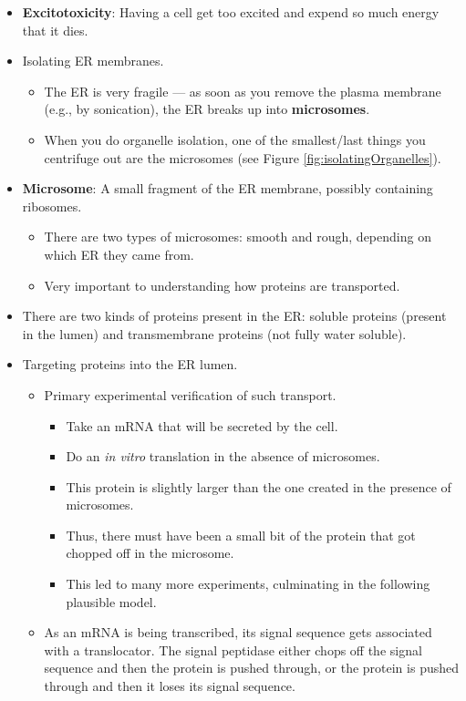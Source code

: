 \documentclass[../notes.tex]{subfiles}
\begin{document}
\begin{itemize}
    \item \textbf{Excitotoxicity}: Having a cell get too excited and expend so much energy that it dies.
    \item Isolating ER membranes.
    \begin{itemize}
        \item The ER is very fragile --- as soon as you remove the plasma membrane (e.g., by sonication), the ER breaks up into \textbf{microsomes}.
        \item When you do organelle isolation, one of the smallest/last things you centrifuge out are the microsomes (see Figure \ref{fig:isolatingOrganelles}).
    \end{itemize}
    \item \textbf{Microsome}: A small fragment of the ER membrane, possibly containing ribosomes.
    \begin{itemize}
        \item There are two types of microsomes: smooth and rough, depending on which ER they came from.
        \item Very important to understanding how proteins are transported.
    \end{itemize}
    \item There are two kinds of proteins present in the ER: soluble proteins (present in the lumen) and transmembrane proteins (not fully water soluble).
    \item Targeting proteins into the ER lumen.
    \begin{itemize}
        \item Primary experimental verification of such transport.
        \begin{itemize}
            \item Take an mRNA that will be secreted by the cell.
            \item Do an \emph{in vitro} translation in the absence of microsomes.
            \item This protein is slightly larger than the one created in the presence of microsomes.
            \item Thus, there must have been a small bit of the protein that got chopped off in the microsome.
            \item This led to many more experiments, culminating in the following plausible model.
        \end{itemize}
        \item As an mRNA is being transcribed, its signal sequence gets associated with a translocator. The signal peptidase either chops off the signal sequence and then the protein is pushed through, or the protein is pushed through and then it loses its signal sequence.

\end{itemize}
\end{itemize}
\end{document}
